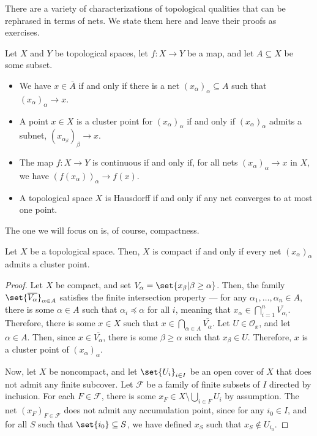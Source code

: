 \documentclass[11pt]{mypackage}
\begin{document}
There are a variety of characterizations of topological qualities that can be rephrased in terms of nets. We state them here and leave their proofs as exercises.
\begin{theorem}
  Let $X$ and $Y$ be topological spaces, let $f\colon X\rightarrow Y$ be a map, and let $A\subseteq X$ be some subset.
  \begin{itemize}
    \item We have $x\in \overline{A}$ if and only if there is a net $\left( x_{\alpha} \right)_{\alpha}\subseteq A$ such that $\left( x_{\alpha} \right)_{\alpha}\rightarrow x$.
    \item A point $x\in X$ is a cluster point for $\left( x_{\alpha} \right)_{\alpha}$ if and only if $\left( x_{\alpha} \right)_{\alpha}$ admits a subnet, $\left( x_{\alpha_{\beta}} \right)_{\beta}\rightarrow x$.
    \item The map $f\colon X\rightarrow Y$ is continuous if and only if, for all nets $\left( x_{\alpha} \right)_{\alpha}\rightarrow x$ in $X$, we have $\left( f\left( x_{\alpha} \right) \right)_{\alpha}\rightarrow f\left( x \right)$.
    \item A topological space $X$ is Hausdorff if and only if any net converges to at most one point.
  \end{itemize}
\end{theorem}
The one we will focus on is, of course, compactness.
\begin{theorem}
  Let $X$ be a topological space. Then, $X$ is compact if and only if every net $\left( x_{\alpha} \right)_{\alpha}$ admits a cluster point.
\end{theorem}
\begin{proof}
  Let $X$ be compact, and set $V_{\alpha} = \set{x_{\beta} | \beta\geq \alpha}$. Then, the family $ \set{\overline{V_{\alpha}}}_{\alpha \in A} $ satisfies the finite intersection property --- for any $\alpha_1,\dots,\alpha_n\in A$, there is some $\alpha\in A$ such that $\alpha_i\preceq \alpha$ for all $i$, meaning that $x_{\alpha}\in \bigcap_{i=1}^{n} \overline{V_{\alpha_i}}$. Therefore, there is some $x\in X$ such that $x\in \bigcap_{\alpha\in A} \overline{V_{\alpha}}$. Let $U\in \mathcal{O}_{x}$, and let $\alpha \in A$. Then, since $x\in \overline{V_{\alpha}}$, there is some $\beta \geq \alpha$ such that $x_{\beta}\in U$. Therefore, $x$ is a cluster point of $\left( x_{\alpha} \right)_{\alpha}$.\newline

  Now, let $X$ be noncompact, and let $\set{U_{i}}_{i\in I}$ be an open cover of $X$ that does not admit any finite subcover. Let $\mathcal{F}$ be a family of finite subsets of $I$ directed by inclusion. For each $F\in \mathcal{F}$, there is some $x_{F}\in X\setminus \bigcup_{i\in F}U_i$ by assumption. The net $\left( x_F \right)_{F\in \mathcal{F}}$ does not admit any accumulation point, since for any $i_0\in I$, and for all $S$ such that $\set{i_0}\subseteq S$, we have defined $x_{S}$ such that $x_S\notin U_{i_0}$.
\end{proof}
\end{document}
